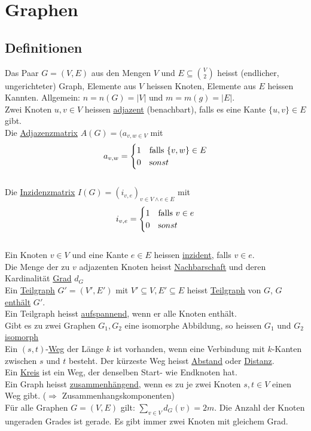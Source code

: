 \documentclass{scrartcl}
\begin{document}

\section{Graphen}
\subsection{Definitionen}
\begin{shaded}
Das Paar $G=(V,E)$ aus den Mengen $V$ und $E\subseteq\binom{V}{2}$ heisst (endlicher, ungerichteter) Graph, Elemente aus $V$ heissen Knoten, Elemente aus $E$ heissen Kannten. Allgemein: $n=n(G)=\vert V\vert$ und $m=m(g)=\vert E\vert$. \\
Zwei Knoten $u,v\in V$ heissen \underline{adjazent} (benachbart), falls es eine Kante $\{u,v\}\in E$ gibt. \\
Die \underline{Adjazenzmatrix} $A(G)=(a_{v,w\in V}$ mit \[a_{v,w}=
\begin{cases}
1 & \textrm{falls } \{v,w\} \in E \\
0 & \textrm sonst
\end{cases} \] \\
Die \underline{Inzidenzmatrix} $I(G)=(i_{v,e})_{v\in V \wedge e\in E}$ mit \[i_{v,e}=
\begin{cases}
1 & \textrm{falls } v\in e \\
0 & \textrm sonst
\end{cases} \] \\
Ein Knoten $v\in V$ und eine Kante $e\in E$ heissen \underline{inzident}, falls $v\in e$. \\
Die Menge der zu $v$ adjazenten Knoten heisst \underline{Nachbarschaft} und deren Kardinalität \underline{Grad} $d_G$\\
Ein \underline{Teilgraph} $G'=(V',E')$ mit $V'\subseteq V, E'\subseteq E$ heisst \underline{Teilgraph} von $G$, $G$ \underline{enthält} $G'$.\\
Ein Teilgraph heisst \underline{aufspannend}, wenn er alle Knoten enthält.\\
Gibt es zu zwei Graphen $G_1,G_2$ eine isomorphe Abbildung, so heissen $G_1$ und $G_2$ \underline{isomorph} \\
Ein $(s,t)$-\underline{Weg} der Länge $k$ ist vorhanden, wenn eine Verbindung mit $k$-Kanten zwischen $s$ und $t$ besteht. Der kürzeste Weg heisst \underline{Abstand} oder \underline{Distanz}. \\
Ein \underline{Kreis} ist ein Weg, der denselben Start- wie Endknoten hat. \\
Ein Graph heisst \underline{zusammenhängend}, wenn es zu je zwei Knoten $s,t\in V$ einen Weg gibt. ($\Rightarrow$ Zusammenhangskomponenten)\\
\vspace{2em}
Für alle Graphen $G=(V,E)$ gilt: $\displaystyle\sum_{v\in V}d_G(v)=2m$. Die Anzahl der Knoten ungeraden Grades ist gerade. Es gibt immer zwei Knoten mit gleichem Grad.
\end{shaded}
\end{document}
